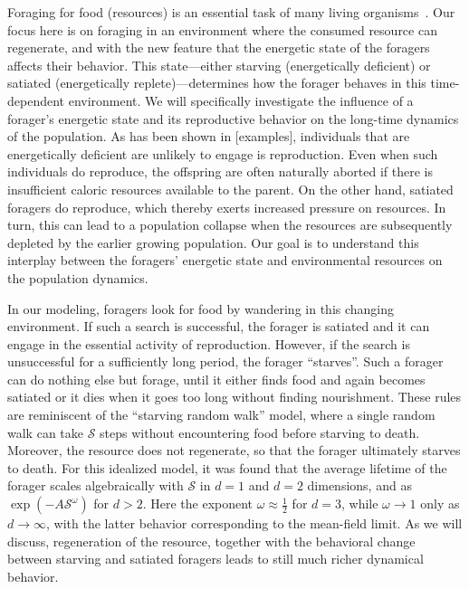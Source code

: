 \documentclass[11pt]{iopart}
\begin{document}
Foraging for food (resources) is an essential task of many living
organisms~\cite{B91,OB90,KM01,ASD97,KR85,SK86,Vea96,LKW88,BLMV11}.  Our focus
here is on foraging in an environment where the consumed resource can
regenerate, and with the new feature that the energetic state of the foragers
affects their behavior.  This state---either starving (energetically
deficient) or satiated (energetically replete)---determines how the forager
behaves in this time-dependent environment.  We will specifically investigate
the influence of a forager's energetic state and its reproductive behavior on
the long-time dynamics of the population.  As has been shown in [examples],
individuals that are energetically deficient are unlikely to engage is
reproduction.  Even when such individuals do reproduce, the offspring are
often naturally aborted if there is insufficient caloric resources available
to the parent.  On the other hand, satiated foragers do reproduce, which
thereby exerts increased pressure on resources.  In turn, this can lead to a
population collapse when the resources are subsequently depleted by the
earlier growing population.  Our goal is to understand this interplay between
the foragers' energetic state and environmental resources on the population
dynamics.

In our modeling, foragers look for food by wandering in this changing
environment.  If such a search is successful, the forager is satiated and it
can engage in the essential activity of reproduction.  However, if the search
is unsuccessful for a sufficiently long period, the forager ``starves''.
Such a forager can do nothing else but forage, until it either finds food and
again becomes satiated or it dies when it goes too long without finding
nourishment.  These rules are reminiscent of the ``starving random walk''
model, where a single random walk can take $\mathcal{S}$ steps without
encountering food before starving to death.  Moreover, the resource does not
regenerate, so that the forager ultimately starves to death.  For this
idealized model, it was found that the average lifetime of the forager scales
algebraically with $\mathcal{S}$ in $d\!=\!1$ and $d\!=\!2$ dimensions, and
as $\exp(-A\mathcal{S}^\omega)$ for $d>2$.  Here the exponent
$\omega\approx \frac{1}{2}$ for $d=3$, while $\omega\to 1$ only as
$d\to \infty$, with the latter behavior corresponding to the mean-field
limit.  As we will discuss, regeneration of the resource, together with the
behavioral change between starving and satiated foragers leads to still much
richer dynamical behavior.
\end{document}
